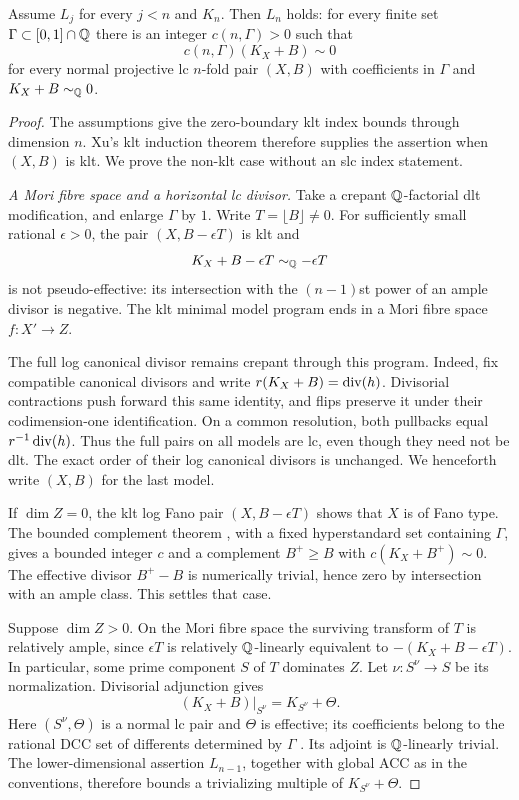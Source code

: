 \begin{proposition}\label{prop:lc-reduction}
Assume $L_j$ for every $j<n$ and $K_n$. Then $L_n$ holds: for every
finite set $\Gamma\subset[0,1]\cap\mathbb Q$ there is an integer
$c(n,\Gamma)>0$ such that
\[
                    c(n,\Gamma)(K_X+B)\sim0
\]
for every normal projective lc $n$-fold pair $(X,B)$ with coefficients
in $\Gamma$ and $K_X+B\sim_{\mathbb Q}0$.
\end{proposition}

\begin{proof}
The assumptions give the zero-boundary klt index bounds through
dimension $n$. Xu's klt induction theorem
\cite[Theorem~1.8]{Xu2019} therefore supplies the assertion when $(X,B)$
is klt. We prove the non-klt case without an slc index statement.

\emph{A Mori fibre space and a horizontal lc divisor.}
Take a crepant $\mathbb Q$-factorial dlt modification, and enlarge $\Gamma$
by $1$. Write $T=\lfloor B\rfloor\ne0$. For sufficiently small
rational $\epsilon>0$, the pair $(X,B-\epsilon T)$ is klt and
\[
                  K_X+B-\epsilon T\sim_{\mathbb Q}-\epsilon T
\]
is not pseudo-effective: its intersection with the $(n-1)$st power
of an ample divisor is negative. The klt minimal model program
\cite[Corollary~1.3.3]{BCHM2010} ends in a Mori fibre space
$f:X'\to Z$.

The full log canonical divisor remains crepant through this program.
Indeed, fix compatible canonical divisors and write
$r(K_X+B)=\operatorname{div}(h)$. Divisorial contractions push forward this same
identity, and flips preserve it under their codimension-one
identification. On a common resolution, both pullbacks equal
$r^{-1}\operatorname{div}(h)$. Thus the full pairs on all models are lc, even
though they need not be dlt. The exact order of their log canonical
divisors is unchanged. We henceforth write $(X,B)$ for the last
model.

If $\dim Z=0$, the klt log Fano pair $(X,B-\epsilon T)$ shows that
$X$ is of Fano type. The bounded complement theorem
\cite[Theorem~1.7]{Birkar2019}, with a fixed hyperstandard set containing
$\Gamma$, gives a bounded integer $c$ and a complement $B^+\ge B$
with $c(K_X+B^+)\sim0$. The effective divisor $B^+-B$ is numerically
trivial, hence zero by intersection with an ample class. This settles
that case.

Suppose $\dim Z>0$. On the Mori fibre space the surviving transform
of $T$ is relatively ample, since $\epsilon T$ is relatively
$\mathbb Q$-linearly equivalent to $-(K_X+B-\epsilon T)$. In particular,
some prime component $S$ of $T$ dominates $Z$. Let
$\nu:S^\nu\to S$ be its normalization. Divisorial adjunction gives
\begin{equation}\label{eq:index-adjunction}
             (K_X+B)|_{S^\nu}=K_{S^\nu}+\Theta.
\end{equation}
Here $(S^\nu,\Theta)$ is a normal lc pair and $\Theta$ is effective;
its coefficients belong to the rational DCC set of differents
determined by $\Gamma$ \cite{KollarMori1998}. Its adjoint is
$\mathbb Q$-linearly trivial. The lower-dimensional assertion $L_{n-1}$,
together with global ACC as in the conventions, therefore bounds a
trivializing multiple of $K_{S^\nu}+\Theta$.


\end{proof}
